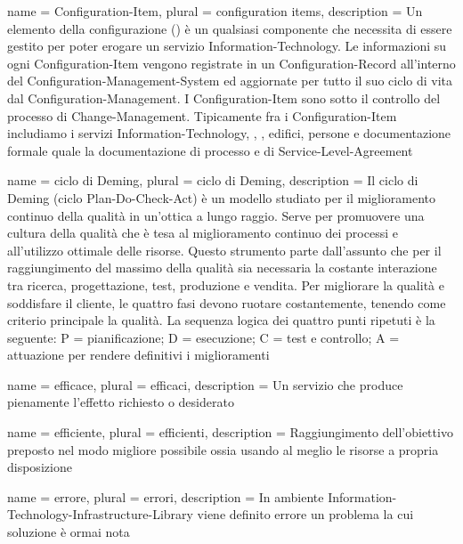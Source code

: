 %
%
{
	name		= {Configuration-Item},
	plural		= {configuration items},
	description = {Un elemento della configurazione () è un qualsiasi componente che necessita di essere gestito per poter erogare un servizio \acs{Information-Technology}. Le informazioni su ogni \acs{Configuration-Item} vengono registrate in un \acf{Configuration-Record} all'interno del \acf{Configuration-Management-System} ed aggiornate per tutto il suo ciclo di vita dal \acf{Configuration-Management}. I \ac{Configuration-Item} sono sotto il controllo del processo di \acs{Change-Management}. Tipicamente fra i \ac{Configuration-Item} includiamo i servizi \acs{Information-Technology}, , , edifici, persone e documentazione formale quale la documentazione di processo e di \acf{Service-Level-Agreement}}
}

{
	name		= {ciclo di Deming},
	plural		= {ciclo di Deming},
	description = {Il ciclo di Deming (ciclo \acf{Plan-Do-Check-Act}) è un modello studiato per il miglioramento continuo della qualità in un'ottica a lungo raggio. Serve per promuovere una cultura della qualità che è tesa al miglioramento continuo dei processi e all'utilizzo ottimale delle risorse. Questo strumento parte dall'assunto che per il raggiungimento del massimo della qualità sia necessaria la costante interazione tra ricerca, progettazione, test, produzione e vendita. Per migliorare la qualità e soddisfare il cliente, le quattro fasi devono ruotare costantemente, tenendo come criterio principale la qualità. La sequenza logica dei quattro punti ripetuti è la seguente: P = pianificazione; D = esecuzione; C = test e controllo; A = attuazione per rendere definitivi i miglioramenti}
}

{
	name		= {efficace},
	plural		= {efficaci},
	description = {Un servizio che produce pienamente l'effetto richiesto o desiderato}
}

{
	name		= {efficiente},
	plural		= {efficienti},
	description = {Raggiungimento dell'obiettivo preposto nel modo migliore possibile ossia usando al meglio le risorse a propria disposizione}
}

{
	name		= {errore},
	plural		= {errori},
	description = {In ambiente \ac{Information-Technology-Infrastructure-Library} viene definito errore un problema la cui soluzione è ormai nota}
}

